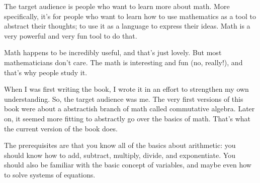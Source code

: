
The target audience is people who want to learn more about math. More
specifically, it's for people who want to learn how to use mathematics as a tool
to abstract their thoughts; to use it as a language to express their ideas. Math
is a very powerful and very fun tool to do that.

Math happens to be incredibly useful, and that's just lovely. But most
mathematicians don't care. The math is interesting and fun (no, really!), and
that's why people study it.

When I was first writing the book, I wrote it in an effort to strengthen
my own understanding. So, the target audience was me. The very first
versions of this book were about a abstractish branch of math called
commutative algebra. Later on, it seemed more fitting to abstractly go
over the basics of math. That's what the current version of the book
does.

The prerequisites are that you know all of the basics about arithmetic: you
should know how to add, subtract, multiply, divide, and exponentiate. You should
also be familiar with the basic concept of variables, and maybe even how to
solve systems of equations.
